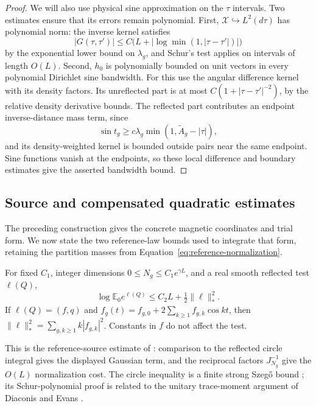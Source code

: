 \begin{proof}
We will also use physical sine approximation on the $\tau$ intervals.
Two estimates ensure that its errors remain polynomial. First,
$\mathcal X\hookrightarrow L^2(d\tau)$ has polynomial norm:
the inverse kernel satisfies
\[
 |G(\tau,\tau')|\le C\bigl(L+
       |\log\min(1,|\tau-\tau'|)|\bigr)
\]
by the exponential lower bound on $\lambda_g$, and Schur's test
applies on intervals of length $O(L)$. Second, $h_0$ is polynomially
bounded on unit vectors in every polynomial Dirichlet sine bandwidth.
For this use the angular difference kernel with its density factors.
Its unreflected part is at most
$C(1+|\tau-\tau'|^{-2})$, by the relative density derivative bounds.
The reflected part contributes an endpoint inverse-distance mass term,
since
\[
 \sin t_g\ge c\lambda_g\min(1,\widetilde A_g-|\tau|),
\]
and its density-weighted kernel is bounded outside pairs near the same
endpoint. Sine functions vanish
at the endpoints, so these local difference and boundary estimates
give the asserted bandwidth bound.
\end{proof}

\subsection{Source and compensated quadratic estimates}\label{sec:reference-integration}

The preceding construction gives the concrete magnetic coordinates and
trial form. We now state the two reference-law bounds used to integrate
that form, retaining the partition masses from
Equation~\eqref{eq:reference-normalization}.

\begin{proposition}\label{prop:reference-source}
For fixed $C_1$, integer dimensions $0\le N_g\le C_1e^{\gamma L}$,
and a real smooth reflected test $\ell(Q)$,
\begin{equation}\label{eq:G-13}
 \log\mathbb E_0 e^{\ell(Q)}\le C_2L+\tfrac12\|\ell\|_*^2.
\end{equation}
If $\ell(Q)=(f,q)$ and
$f_g(t)=f_{g,0}+2\sum_{k\ge1}f_{g,k}\cos kt$, then
$\|\ell\|_*^2=\sum_{g,k\ge1}k|f_{g,k}|^2$.
Constants in $f$ do not affect the test.
\end{proposition}

This is the reference-source estimate of
\cite[Theorem~4.2]{Electric}: comparison to the reflected circle
integral gives the displayed Gaussian term, and the reciprocal factors
$J_{N_g}^{-1}$ give the $O(L)$ normalization cost. The circle inequality
is a finite strong Szeg\H{o} bound \cite{Simon2005Szego}; its
Schur-polynomial proof is related to the unitary trace-moment argument
of Diaconis and Evans \cite{DiaconisEvans2001}.

